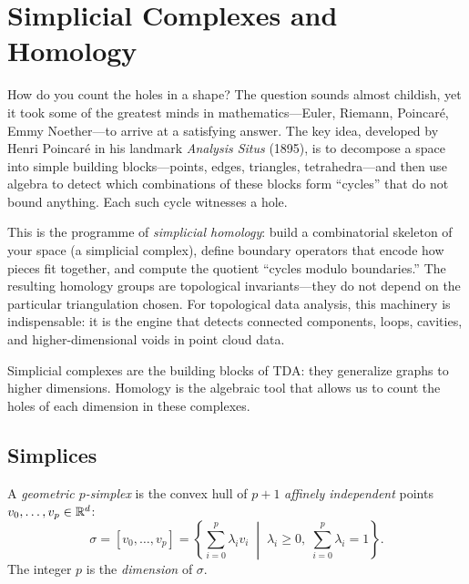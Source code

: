 \chapter{Simplicial Complexes and Homology}
\label{ch:simplicial}

How do you count the holes in a shape? The question sounds almost childish, yet it took some of the greatest minds in mathematics---Euler, Riemann, Poincar\'e, Emmy Noether---to arrive at a satisfying answer. The key idea, developed by Henri Poincar\'e in his landmark \emph{Analysis Situs} (1895), is to decompose a space into simple building blocks---points, edges, triangles, tetrahedra---and then use algebra to detect which combinations of these blocks form ``cycles'' that do not bound anything. Each such cycle witnesses a hole.

This is the programme of \emph{simplicial homology}: build a combinatorial skeleton of your space (a simplicial complex), define boundary operators that encode how pieces fit together, and compute the quotient ``cycles modulo boundaries.'' The resulting homology groups are topological invariants---they do not depend on the particular triangulation chosen. For topological data analysis, this machinery is indispensable: it is the engine that detects connected components, loops, cavities, and higher-dimensional voids in point cloud data.

\begin{intuition}
Simplicial complexes are the building blocks of TDA: they generalize
graphs to higher dimensions. Homology is the algebraic tool that allows
us to count the holes of each dimension in these complexes.
\end{intuition}

\section{Simplices}

\begin{definition}
A \emph{geometric $p$-simplex} is the convex hull of $p+1$
\emph{affinely independent} points $v_0, \ldots, v_p \in \mathbb{R}^d$:
\[
  \sigma = [v_0, \ldots, v_p]
  = \left\{ \sum_{i=0}^{p} \lambda_i v_i
    \;\middle|\;
    \lambda_i \geq 0,\; \sum_{i=0}^{p} \lambda_i = 1 \right\}.
\]
The integer $p$ is the \emph{dimension} of $\sigma$.
\end{definition}

